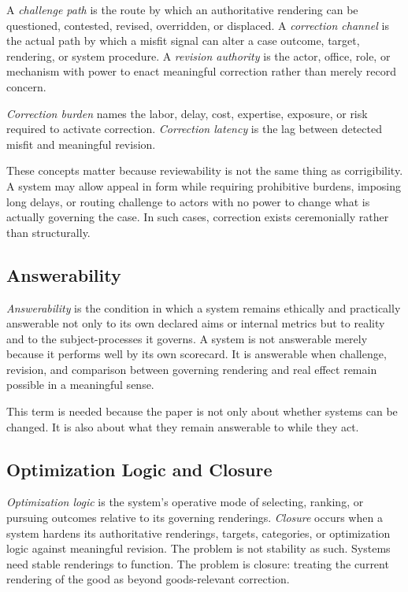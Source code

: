 \documentclass[11pt]{article}
\renewcommand{\emph}[1]{\textit{#1}}
\begin{document}
A \emph{challenge path} is the route by which an authoritative rendering can be questioned, contested, revised, overridden, or displaced. A \emph{correction channel} is the actual path by which a misfit signal can alter a case outcome, target, rendering, or system procedure. A \emph{revision authority} is the actor, office, role, or mechanism with power to enact meaningful correction rather than merely record concern.

\emph{Correction burden} names the labor, delay, cost, expertise, exposure, or risk required to activate correction. \emph{Correction latency} is the lag between detected misfit and meaningful revision.

These concepts matter because reviewability is not the same thing as corrigibility. A system may allow appeal in form while requiring prohibitive burdens, imposing long delays, or routing challenge to actors with no power to change what is actually governing the case. In such cases, correction exists ceremonially rather than structurally.\cite{Swanson2026CorrectiveEthicsConstraint,MoynihanHerdHarvey2015AdministrativeBurden}

\subsection{Answerability}

\emph{Answerability} is the condition in which a system remains ethically and practically answerable not only to its own declared aims or internal metrics but to reality and to the subject-processes it governs. A system is not answerable merely because it performs well by its own scorecard. It is answerable when challenge, revision, and comparison between governing rendering and real effect remain possible in a meaningful sense.

This term is needed because the paper is not only about whether systems can be changed. It is also about what they remain answerable to while they act.

\subsection{Optimization Logic and Closure}

\emph{Optimization logic} is the system's operative mode of selecting, ranking, or pursuing outcomes relative to its governing renderings. \emph{Closure} occurs when a system hardens its authoritative renderings, targets, categories, or optimization logic against meaningful revision. The problem is not stability as such. Systems need stable renderings to function. The problem is closure: treating the current rendering of the good as beyond goods-relevant correction.
\end{document}
